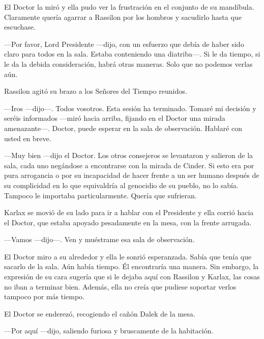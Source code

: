 El Doctor la miró y ella pudo ver la frustración en el conjunto de su mandíbula. Claramente quería agarrar a Rassilon por los hombros y sacudirlo hasta que escuchase.

—Por favor, Lord Presidente —dijo, con un esfuerzo que debía de haber sido claro para todos en la sala. Estaba conteniendo una diatriba—. Si le da tiempo, si le da la debida consideración, habrá otras maneras. Solo que no podemos verlas aún.

Rassilon agitó su brazo a los Señores del Tiempo reunidos. 

—Iros —dijo—. Todos vosotros. Esta sesión ha terminado. Tomaré mi decisión y seréis informados —miró hacia arriba, fijando en el Doctor una mirada amenazante—. Doctor, puede esperar en la sala de observación. Hablaré con usted en breve.

—Muy bien —dijo el Doctor. Los otros consejeros se levantaron y salieron de la sala, cada uno negándose a encontrarse con la mirada de Cinder. Si esto era por pura arrogancia o por su incapacidad de hacer frente a un ser humano después de su complicidad en lo que equivaldría al genocidio de su pueblo, no lo sabía. Tampoco le importaba particularmente. Quería que sufrieran.

Karlax se movió de su lado para ir a hablar con el Presidente y ella corrió hacia el Doctor, que estaba apoyado pesadamente en la mesa, con la frente arrugada. 

—Vamos —dijo—. Ven y muéstrame esa sala de observación.

El Doctor miro a su alrededor y ella le sonrió esperanzada. Sabía que tenía que sacarlo de la sala. Aún había tiempo. Él encontraría una manera. Sin embargo, la expresión de su cara sugería que si le dejaba aquí con Rassilon y Karlax, las cosas no iban a terminar bien. Además, ella no creía que pudiese soportar verlos tampoco por más tiempo.

El Doctor se enderezó, recogiendo el cañón Dalek de la mesa. 

—Por aquí —dijo, saliendo furiosa y bruscamente de la habitación.










